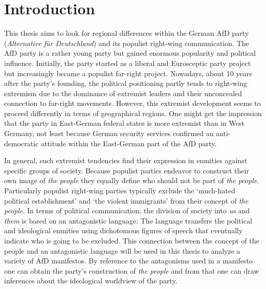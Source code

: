 \documentclass[a4paper]{scrreprt}
\begin{document}
\chapter{Introduction}
This thesis aims to look for regional differences within the German AfD party ({\em Alternative für Deutschland}) and its populist right-wing communication. The AfD party is a rather young party but gained enormous popularity and political influence. Initially, the party started as a liberal and Eurosceptic party project but increasingly became a populist far-right project. Nowadays, about 10 years after the party’s founding, the political positioning partly tends to right-wing extremism due to the dominance of extremist leaders and their unconcealed connection to far-right movements. However, this extremist development seems to proceed differently in terms of geographical regions. One might get the impression that the party in East-German federal states is more extremist than in West Germany, not least because German security services confirmed an anti-democratic attitude within the East-German part of the AfD party.\par
In general, such extremist tendencies find their expression in enmities against specific groups of society. Because populist parties endeavor to construct their own image of {\em the people} they equally define who should not be part of {\em the people}. Particularly populist right-wing parties typically exclude the `much-hated political establishment' and `the violent immigrants' from their concept of {\em the people}. In terms of political communication, the division of society into {\em us} and {\em them} is based on an antagonistic language: The language transfers the political and ideological enmities using dichotomous figures of speech that eventually indicate who is going to be excluded. This connection between the concept of the people and an antagonistic language will be used in this thesis to analyze a variety of AfD manifestos. By reference to the antagonisms used in a manifesto one can obtain the party’s construction of {\em the people} and from that one can draw inferences about the ideological worldview of the party.\par
\end{document}
